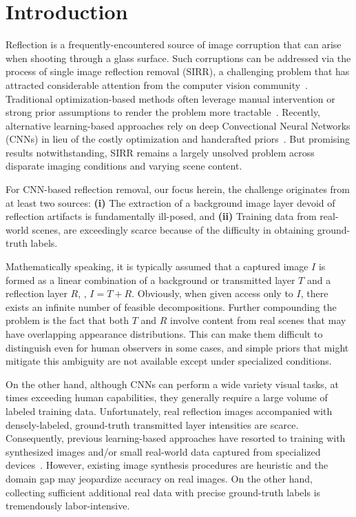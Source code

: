 \documentclass[10pt,twocolumn,letterpaper]{article}
\begin{document}
\section{Introduction}
Reflection is a frequently-encountered source of image corruption that can arise when shooting through a glass surface. Such corruptions can be addressed via the process of single image reflection removal (SIRR), a challenging problem that has attracted considerable attention from the computer vision community~\cite{levin2007user,Li2014Single,wan2016depth,Arvanitopoulos_2017_CVPR,fan2017generic,zhang2018single,eccv18refrmv,Wan_2018_CVPR}. Traditional optimization-based methods often leverage manual intervention or strong prior assumptions to render the problem more tractable~\cite{levin2007user,Li2014Single}. Recently, alternative learning-based approaches rely  on  deep Convectional Neural Networks (CNNs) in lieu of the costly optimization and handcrafted priors~\cite{fan2017generic,zhang2018single,eccv18refrmv,Wan_2018_CVPR}. But promising results notwithstanding, SIRR remains a largely unsolved problem across disparate imaging conditions and varying scene content.

For CNN-based reflection removal, our focus herein, the challenge originates from at least two sources: \textbf{(i)} The extraction of a background image layer devoid of reflection artifacts is fundamentally ill-posed, and \textbf{(ii)} Training data from real-world scenes, are exceedingly scarce because of the difficulty in obtaining ground-truth labels.  

Mathematically speaking, it is typically assumed that a captured image $I$ is formed as a linear combination of a background or transmitted layer $T$ and a reflection layer $R$, \ie, $I=T+R$.  Obviously, when given access only to $I$, there exists an infinite number of feasible decompositions.  Further compounding the problem is the fact that both $T$ and $R$ involve content from real scenes that may have overlapping appearance distributions. This can make them difficult to distinguish even for human observers in some cases, and simple priors that might mitigate this ambiguity are not available except under specialized conditions.

On the other hand, although CNNs can perform a wide variety visual tasks, at times exceeding human capabilities, they generally require a large volume of labeled training data. Unfortunately, 
real reflection images accompanied with densely-labeled, ground-truth transmitted layer intensities are scarce. Consequently, previous learning-based approaches have resorted to training with synthesized images \cite{fan2017generic,Wan_2018_CVPR,zhang2018single} and/or small real-world data captured from specialized devices~\cite{zhang2018single}. However, existing image synthesis procedures are heuristic and the domain gap may jeopardize accuracy on real images. On the other hand, collecting sufficient additional real data with precise ground-truth labels is tremendously labor-intensive.
\end{document}

